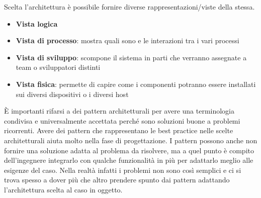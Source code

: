 Scelta l'architettura è possibile fornire diverse rappresentazioni/viste della stessa.
\begin{itemize}[noitemsep]
    \item \textbf{Vista logica}
    \item \textbf{Vista di processo}: mostra quali sono e le interazioni tra i vari processi
    \item \textbf{Vista di sviluppo}: scompone il sistema in parti che verranno assegnate a team o sviluppatori distinti
    \item \textbf{Vista fisica}: permette di capire come i componenti potranno essere installati sui diversi dispositivi o i diversi host
\end{itemize}
È importanti rifarsi a dei pattern architetturali per avere una terminologia condivisa e universalmente accettata perché sono soluzioni buone a problemi ricorrenti.
Avere dei pattern che rappresentano le best practice nelle scelte architetturali aiuta molto nella fase di progettazione.
I pattern possono anche non fornire una soluzione adatta al problema da risolvere, ma a quel punto è compito dell'ingegnere integrarlo con qualche funzionalità in più per adattarlo meglio alle esigenze del caso.
Nella realtà infatti i problemi non sono così semplici e ci si trova spesso a dover più che altro prendere spunto dai pattern adattando l'architettura scelta al caso in oggetto.


